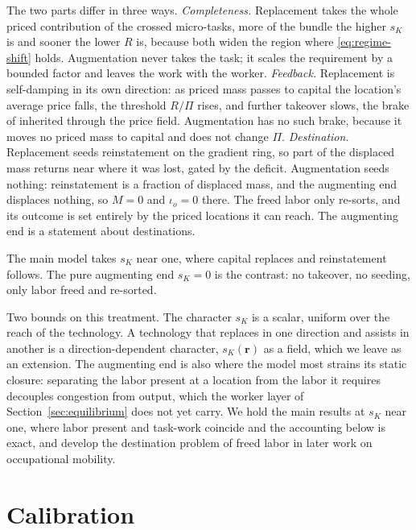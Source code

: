 \documentclass[12pt, a4paper]{article}
\begin{document}
The two parts differ in three ways. \emph{Completeness.} Replacement
takes the whole priced contribution of the crossed micro-tasks, more of
the bundle the higher $s_K$ is and sooner the lower $R$ is, because both
widen the region where \eqref{eq:regime-shift} holds. Augmentation never
takes the task; it scales the requirement by a bounded factor and leaves
the work with the worker. \emph{Feedback.} Replacement is self-damping in
its own direction: as priced mass passes to capital the location's
average price falls, the threshold $R/\Pi$ rises, and further takeover
slows, the brake of \textcite{acemoglu2018race} inherited through the
price field. Augmentation has no such brake, because it moves no priced
mass to capital and does not change $\Pi$. \emph{Destination.}
Replacement seeds reinstatement on the gradient ring, so part of the
displaced mass returns near where it was lost, gated by the deficit.
Augmentation seeds nothing: reinstatement is a fraction of displaced
mass, and the augmenting end displaces nothing, so $M = 0$ and
$\iota_o = 0$ there. The freed labor only re-sorts, and its outcome is
set entirely by the priced locations it can reach. The augmenting end is
a statement about destinations.

The main model takes $s_K$ near one, where capital replaces and
reinstatement follows. The pure augmenting end $s_K = 0$ is the contrast:
no takeover, no seeding, only labor freed and re-sorted.

Two bounds on this treatment. The character $s_K$ is a scalar, uniform
over the reach of the technology. A technology that replaces in one
direction and assists in another is a direction-dependent character,
$s_K(\mathbf{r})$ as a field, which we leave as an extension. The
augmenting end is also where the model most strains its static closure:
separating the labor present at a location from the labor it requires
decouples congestion from output, which the worker layer of
Section~\ref{sec:equilibrium} does not yet carry. We hold the main
results at $s_K$ near one, where labor present and task-work coincide and
the accounting below is exact, and develop the destination problem of
freed labor in later work on occupational mobility.

\section{Calibration}
\label{sec:calibration}
\end{document}
